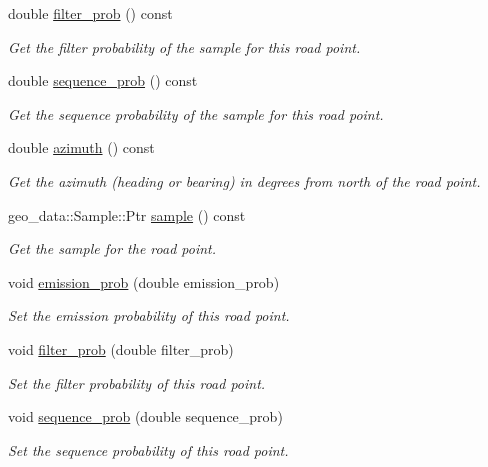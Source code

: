 \begin{DoxyCompactItemize}
double \hyperlink{classhmm__mm_1_1RoadPoint_ac5e490bd5f602d393a58705ef1b16fed}{filter\+\_\+prob} () const 
\begin{DoxyCompactList}\small\item\em Get the filter probability of the sample for this road point. \end{DoxyCompactList}\item 
double \hyperlink{classhmm__mm_1_1RoadPoint_afd05e1d555115d5119d61d2aec3b7f01}{sequence\+\_\+prob} () const 
\begin{DoxyCompactList}\small\item\em Get the sequence probability of the sample for this road point. \end{DoxyCompactList}\item 
double \hyperlink{classhmm__mm_1_1RoadPoint_a09adddfdb8e81fd96645dd638a1e1603}{azimuth} () const 
\begin{DoxyCompactList}\small\item\em Get the azimuth (heading or bearing) in degrees from north of the road point. \end{DoxyCompactList}\item 
geo\+\_\+data\+::\+Sample\+::\+Ptr \hyperlink{classhmm__mm_1_1RoadPoint_a3cd18236757a75ec37336cad017260c6}{sample} () const 
\begin{DoxyCompactList}\small\item\em Get the sample for the road point. \end{DoxyCompactList}\item 
void \hyperlink{classhmm__mm_1_1RoadPoint_a811fa18ab70ddc70dcb258f486ac2666}{emission\+\_\+prob} (double emission\+\_\+prob)
\begin{DoxyCompactList}\small\item\em Set the emission probability of this road point. \end{DoxyCompactList}\item 
void \hyperlink{classhmm__mm_1_1RoadPoint_afd6f0812876d3bb1c9ac8547ac33d825}{filter\+\_\+prob} (double filter\+\_\+prob)
\begin{DoxyCompactList}\small\item\em Set the filter probability of this road point. \end{DoxyCompactList}\item 
void \hyperlink{classhmm__mm_1_1RoadPoint_afe446e7eaffe7c2830ba7747c7b5d14d}{sequence\+\_\+prob} (double sequence\+\_\+prob)
\begin{DoxyCompactList}\small\item\em Set the sequence probability of this road point. \end{DoxyCompactList}\item 

\end{DoxyCompactItemize}
